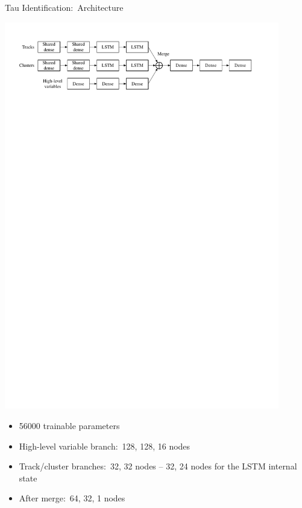 \documentclass[11pt, xcolor={dvipsnames}, aspectratio=169, notes]{beamer}
\begin{document}
\begin{frame}{Tau Identification:\ Architecture}
  \begin{center}
    \includegraphics[width=0.9\textwidth]{tauid/pubnote/rnn_network_architecture}
  \end{center}

  \begin{itemize}
    \setlength{\itemsep}{0.5em}

  \item \num{56000} trainable parameters

  \item High-level variable branch:\ 128, 128, 16 nodes

  \item Track/cluster branches:\ 32, 32 nodes -- 32, 24 nodes for the LSTM
    internal state

  \item After merge:\ 64, 32, 1 nodes

  \end{itemize}
\end{frame}
\end{document}
